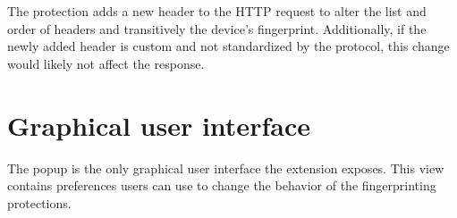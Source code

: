 \medbreak

The protection adds a new header to the HTTP request to alter the list and order of headers and transitively the device's fingerprint. Additionally, if the newly added header is custom and not standardized by the protocol, this change would likely not affect the response.

\section{Graphical user interface}
\label{Section:GUI}

The popup is the only graphical user interface the extension exposes. This view contains preferences users can use to change the behavior of the fingerprinting protections.

\medbreak

